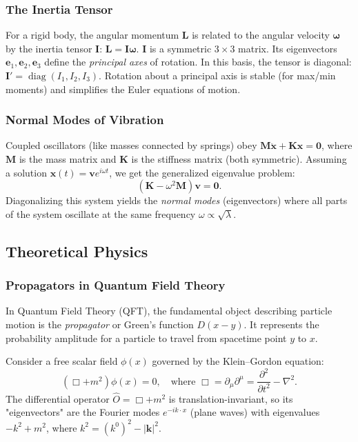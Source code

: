 \subsubsection{The Inertia Tensor}
For a rigid body, the angular momentum $\mathbf{L}$ is related to the angular velocity $\boldsymbol{\omega}$ by the inertia tensor $\mathbf{I}$: $\mathbf{L} = \mathbf{I}\boldsymbol{\omega}$.
$\mathbf{I}$ is a symmetric $3 \times 3$ matrix. Its eigenvectors $\mathbf{e}_1, \mathbf{e}_2, \mathbf{e}_3$ define the \emph{principal axes} of rotation.
In this basis, the tensor is diagonal: $\mathbf{I}' = \operatorname{diag}(I_1, I_2, I_3)$.
Rotation about a principal axis is stable (for max/min moments) and simplifies the Euler equations of motion.

\subsubsection{Normal Modes of Vibration}
Coupled oscillators (like masses connected by springs) obey $\mathbf{M}\ddot{\mathbf{x}} + \mathbf{K}\mathbf{x} = \mathbf{0}$, where $\mathbf{M}$ is the mass matrix and $\mathbf{K}$ is the stiffness matrix (both symmetric).
Assuming a solution $\mathbf{x}(t) = \mathbf{v} e^{i\omega t}$, we get the generalized eigenvalue problem:
\[
  (\mathbf{K} - \omega^2 \mathbf{M})\mathbf{v} = \mathbf{0}.
\]
Diagonalizing this system yields the \emph{normal modes} (eigenvectors) where all parts of the system oscillate at the same frequency $\omega \propto \sqrt{\lambda}$.

\subsection{Theoretical Physics}

\subsubsection{Propagators in Quantum Field Theory}
In Quantum Field Theory (QFT), the fundamental object describing particle motion is the \emph{propagator} or Green's function $D(x-y)$. It represents the probability amplitude for a particle to travel from spacetime point $y$ to $x$.

Consider a free scalar field $\phi(x)$ governed by the Klein--Gordon equation:
\[
  (\Box + m^2)\phi(x) = 0, \quad \text{where } \Box = \partial_\mu \partial^\mu = \frac{\partial^2}{\partial t^2} - \nabla^2.
\]
The differential operator $\hat{O} = \Box + m^2$ is translation-invariant, so its "eigenvectors" are the Fourier modes $e^{-ik \cdot x}$ (plane waves) with eigenvalues $-k^2 + m^2$, where $k^2 = (k^0)^2 - |\mathbf{k}|^2$.

